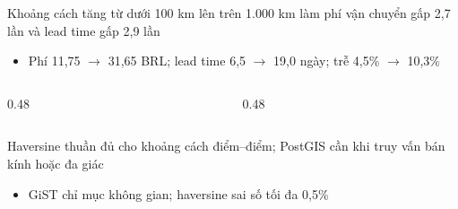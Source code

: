 \begin{frame}{Khoảng cách tăng từ dưới 100 km lên trên 1.000 km làm phí vận chuyển gấp 2,7 lần và lead time gấp 2,9 lần}
\begin{itemize}
  \item Phí 11,75 $\rightarrow$ 31,65 BRL; lead time 6,5 $\rightarrow$ 19,0 ngày; trễ 4,5\% $\rightarrow$ 10,3\%
\end{itemize}
\begin{columns}[c]\begin{column}{0.48\textwidth}\end{column}\begin{column}{0.48\textwidth}\end{column}\end{columns}

\end{frame}

\begin{frame}{Haversine thuần đủ cho khoảng cách điểm–điểm; PostGIS cần khi truy vấn bán kính hoặc đa giác}
\begin{itemize}
  \item GiST chỉ mục không gian; haversine sai số tối đa 0,5\%
\end{itemize}

\end{frame}

